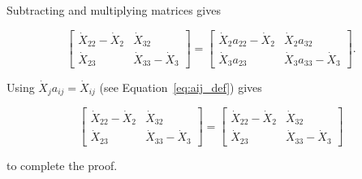 \noindent Subtracting and multiplying matrices gives

\begin{equation} \label{eq:Xdifference1Proof-3}
	\begin{bmatrix} 	
		\dot{X}_{22} - \dot{X}_{2} & \dot{X}_{32}	\\
		\dot{X}_{23}               & \dot{X}_{33} - \dot{X}_{3}
	\end{bmatrix}
	=
	\begin{bmatrix} 	
		\dot{X}_{2} a_{22} - \dot{X}_{2} & \dot{X}_{2} a_{32}	\\
		\dot{X}_{3} a_{23}               & \dot{X}_{3} a_{33} - \dot{X}_{3}
	\end{bmatrix}.
\end{equation}

\noindent Using $\dot{X}_j a_{ij} = \dot{X}_{ij}$ (see Equation~\ref{eq:aij_def}) gives

\begin{equation} \label{eq:Xdifference1Proof-4}
	\begin{bmatrix} 	
		\dot{X}_{22} - \dot{X}_{2} & \dot{X}_{32}	\\
		\dot{X}_{23}               & \dot{X}_{33} - \dot{X}_{3}
	\end{bmatrix} 
	= 
	\begin{bmatrix} 	
		\dot{X}_{22} - \dot{X}_{2} & \dot{X}_{32}	\\
		\dot{X}_{23}               & \dot{X}_{33} - \dot{X}_{3}
	\end{bmatrix}
\end{equation}

\noindent to complete the proof.



